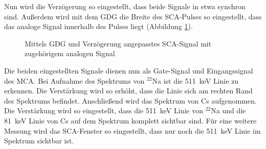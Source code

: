 Nun wird die Verzögerung so eingestellt, dass beide Signale in etwa synchron sind. Außerdem wird mit dem GDG die Breite des SCA-Pulses so eingestellt, dass das analoge Signal innerhalb des Pulses liegt (Abbildung \ref{fig:zeitliche_breite_sca_und_analog}).

\begin{figure}[h]
  \centering
  \caption{Mittels GDG und Verzögerung angepasstes SCA-Signal mit zugehörigem analogen Signal}
  \label{fig:zeitliche_breite_sca_und_analog}
\end{figure}
Die beiden eingestellten Signale dienen nun als Gate-Signal und Eingangssignal des MCA. Bei Aufnahme des Spektrums von $^{22}$Na ist die \SI{511}{\kilo\electronvolt} Linie zu erkennen. Die Verstärkung wird so erhöht, dass die Linie sich am rechten Rand des Spektrums befindet. Anschließend wird das Spektrum von Cs aufgenommen. Die Verstärkung wird so eingestellt, dass die \SI{511}{\kilo\electronvolt} Linie von $^{22}$Na und die \SI{81}{\kilo\electronvolt} Linie von Cs auf dem Spektrum komplett sichtbar sind. Für eine weitere Messung wird das SCA-Fenster so eingestellt, dass nur noch die \SI{511}{\kilo\electronvolt} Linie im Spektrum sichtbar ist. 
\\

